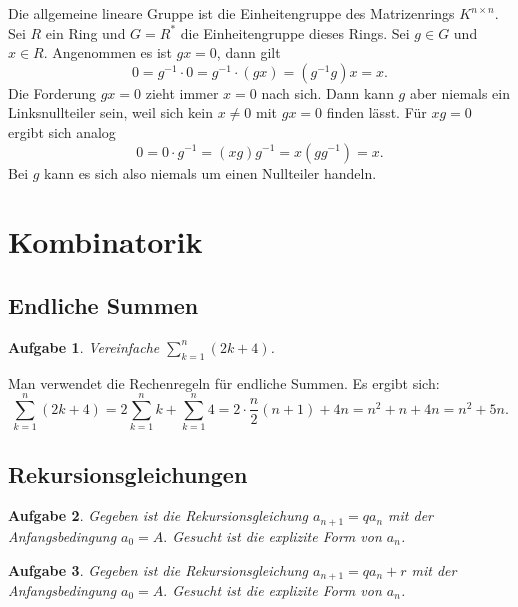 \documentclass[a4paper,10pt,fleqn,twoside]{scrartcl}
\numberwithin{equation}{section}
\newcommand{\strong}[1]{{\normalfont\sffamily\bfseries #1}}
\theoremstyle{Aufgabe}
\newtheorem{Aufgabe}{\sffamily Aufgabe}[section]
\begin{document}
Die allgemeine lineare Gruppe ist die Einheitengruppe des Matrizenrings
$K^{n\times n}$. Sei $R$ ein Ring und $G=R^*$ die Einheitengruppe
dieses Rings. Sei $g\in G$ und $x\in R$. Angenommen es ist $gx=0$,
dann gilt%
\begin{equation}
0 = g^{-1}\cdot 0 = g^{-1}\cdot (gx) = (g^{-1}g)x = x.
\end{equation}
Die Forderung $gx=0$ zieht immer $x=0$ nach sich. Dann kann $g$ aber
niemals ein Linksnullteiler sein, weil sich kein $x\ne 0$ mit $gx=0$
finden lässt. Für $xg=0$ ergibt sich analog%
\begin{equation}
0 = 0\cdot g^{-1} = (xg)g^{-1} = x(gg^{-1}) = x.
\end{equation}
Bei $g$ kann es sich also niemals um einen Nullteiler handeln.

\newpage
\section{Kombinatorik}
\subsection{Endliche Summen}
\begin{Aufgabe}
Vereinfache $\displaystyle\sum_{k=1}^n (2k+4)$.
\end{Aufgabe}

\noindent\strong{Lösung.}
Man verwendet die Rechenregeln für endliche Summen.
Es ergibt sich:
\begin{equation}
\sum_{k=1}^n (2k+4) = 2\sum_{k=1}^n k + \sum_{k=1}^n 4
= 2\cdot\frac{n}{2}(n+1)+4n = n^2+n+4n = n^2+5n.
\end{equation}

\subsection{Rekursionsgleichungen}

\begin{Aufgabe}\label{qPotenzen}
Gegeben ist die Rekursionsgleichung $a_{n+1} = qa_n$
mit der Anfangsbedingung $a_0=A.$
Gesucht ist die explizite Form von $a_n$.
\end{Aufgabe}

\begin{Aufgabe}
Gegeben ist die Rekursionsgleichung
$a_{n+1} = qa_n+r$
mit der Anfangsbedingung
$a_0=A.$
Gesucht ist die explizite Form von $a_n$.
\end{Aufgabe}
\end{document}
